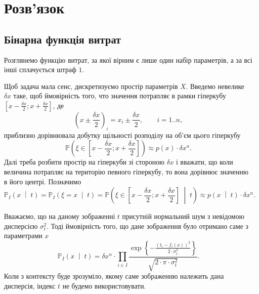 \section{Розв'язок}

\subsection{Бінарна функція витрат}

Розглянемо функцію витрат,
за якої вірним є лише один набір параметрів,
а за всі інші сплачується штраф $1$.

Щоб задача мала сенс, дискретизуємо простір параметрів $X$.
Введемо невелике $\delta x$ таке,
щоб ймовірність того, что значення потрапляє в рамки гіперкубу
$\left[ x - \frac{\delta x}{2}; x + \frac{\delta x}{2} \right]$, де
\begin{equation*}
  \left( x \pm \frac{\delta x}{2} \right)_i = x_i \pm \frac{\delta x}{2},\qquad
  i = 1..n,
\end{equation*}
приблизно дорівнювала добутку щільності розподілу на об'єм цього гіперкубу
\begin{equation*}
  \mathbb{P}\left( \xi \in \left[ x - \frac{\delta x}{2};
                                  x + \frac{\delta x}{2} \right] \right)
  \approx p\left( x \right) \cdot \delta x^n.
\end{equation*}
Далі треба розбити простір на гіперкуби
зі стороною $\delta x$ і вважати,
що коли величина потрапляє на територію певного гіперкубу,
то вона дорівнює значенню в його центрі.
Позначимо
\begin{equation*}
  \mathbb{P}_I\left( x \;\middle|\; t \right)
  = \mathbb{P}_I\left( \xi = x \;\middle|\; t \right)
  = \mathbb{P}\left( \xi \in \left[ x - \frac{\delta x}{2};
                                    x + \frac{\delta x}{2} \right]
    \;\middle|\; t \right)
  \approx p\left( x \;\middle|\; t \right) \cdot \delta x^n.
\end{equation*}

Вважаємо, що на даному зображенні $t$
присутній нормальний шум з невідомою дисперсією $\sigma^2_t$.
Тоді ймовірність того,
що дане зображення було отримано саме з параметрами $x$
\begin{equation*}
  \mathbb{P}_I\left( x \;\middle|\; t \right)
  = \delta x^n \cdot \prod_{i \in I}
    \frac{\exp{\left\{- \frac{\left( t_i - f_i\left( x \right) \right)^2}
           {2 \cdot \sigma^2_t} \right\}}}
           {\sqrt{2 \cdot \pi \cdot \sigma^2_t}}.
\end{equation*}
Коли з контексту буде зрозуміло,
якому саме зображенню належить дана дисперсія,
індекс $t$ не будемо використовувати.

